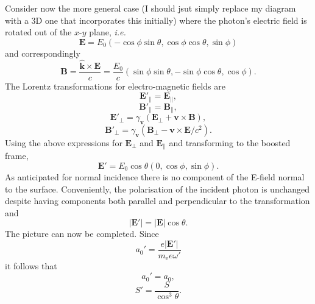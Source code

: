 Consider now the more general case (I should jsut simply replace my diagram with a 3D one that incorporates this initially) where the photon's electric field is rotated out of the $x$-$y$ plane, \textit{i.e.}
\begin{equation}
	\mathbf{E} = E_0(-\cos\phi\sin\theta,\cos\phi\cos\theta,\sin\phi)
\end{equation}
and correspondingly
\begin{equation}
	\mathbf{B} = \frac{\hat{\mathbf{k}} \times \mathbf{E}}{c}= \frac{E_0}{c}(\sin\phi\sin\theta,-\sin\phi\cos\theta,\cos\phi).
\end{equation}
The Lorentz transformations for electro-magnetic fields are
\begin{equation}
	\mathbf{E}'_\parallel = \mathbf{E}_\parallel,
\end{equation}
\begin{equation}
	\mathbf{B}'_\parallel = \mathbf{B}_\parallel,
\end{equation}
\begin{equation}
	\mathbf{E}'_\perp = \gamma_\mathbf{v}(\mathbf{E}_\perp + \mathbf{v} \times \mathbf{B}),
\end{equation}
\begin{equation}
	\mathbf{B}'_\perp = \gamma_\mathbf{v}(\mathbf{B}_\perp - \mathbf{v} \times \mathbf{E}/c^2).
\end{equation}
Using the above expressions for $\mathbf{E}_\perp$ and $\mathbf{E}_\parallel$ and transforming to the boosted frame,
\begin{equation}
	\mathbf{E}' = E_0\cos\theta (0,\cos\phi,\sin\phi).
\end{equation}
As anticipated for normal incidence there is no component of the E-field normal to the surface. Conveniently, the polarisation of the incident photon is unchanged despite having components both parallel and perpendicular to the transformation and 
\begin{equation}
	|\mathbf{E}'| = |\mathbf{E}|\cos\theta.
\end{equation}
The picture can now be completed. Since
\begin{equation}
	a_0' = \frac{e|\mathbf{E}'|}{m_\mathrm{e}e\omega'}
\end{equation}
it follows that
\begin{equation}
	a_0' = a_0,
\end{equation}
\begin{equation}
	S' = \frac{S}{\cos^3\theta}.
\end{equation}


